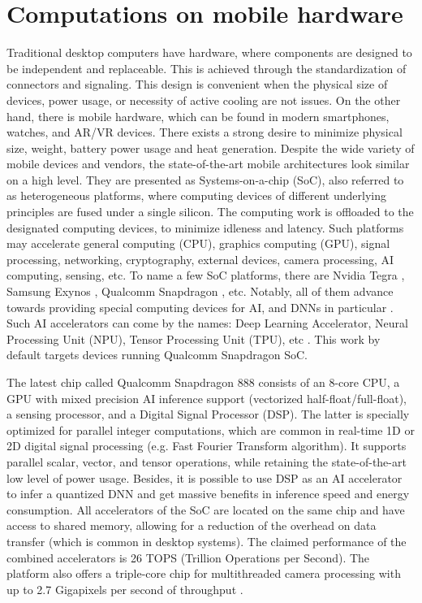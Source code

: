 %

\section{Computations on mobile hardware}
\label{lit:mobile}

Traditional desktop computers have hardware, where components are designed to be independent and replaceable. This is achieved through the standardization of connectors and signaling. This design is convenient when the physical size of devices, power usage, or necessity of active cooling are not issues. On the other hand, there is mobile hardware, which can be found in modern smartphones, watches, and AR/VR devices. There exists a strong desire to minimize physical size, weight, battery power usage and heat generation. Despite the wide variety of mobile devices and vendors, the state-of-the-art mobile architectures look similar on a high level. They are presented as Systems-on-a-chip (SoC), also referred to as heterogeneous platforms, where computing devices of different underlying principles are fused under a single silicon. The computing work is offloaded to the designated computing devices, to minimize idleness and latency. Such platforms may accelerate general computing (CPU), graphics computing (GPU), signal processing, networking, cryptography, external devices, camera processing, AI computing, sensing, etc. To name a few SoC platforms, there are Nvidia Tegra \cite{soc:nvidia-tegra}, Samsung Exynos \cite{soc:exynos}, Qualcomm Snapdragon \cite{soc:snapdragon}, etc. Notably, all of them advance towards providing special computing devices for AI, and DNNs in particular \cite{mobile:dl-review19}. Such AI accelerators can come by the names: Deep Learning Accelerator, Neural Processing Unit (NPU), Tensor Processing Unit (TPU), etc \cite{soc:tops}. This work by default targets devices running Qualcomm Snapdragon SoC.

The latest chip called Qualcomm Snapdragon 888 consists of an 8-core CPU, a GPU with mixed precision AI inference support (vectorized half-float/full-float), a sensing processor, and a Digital Signal Processor (DSP). The latter is specially optimized for parallel integer computations, which are common in real-time 1D or 2D digital signal processing (e.g. Fast Fourier Transform algorithm). It supports parallel scalar, vector, and tensor operations, while retaining the state-of-the-art low level of power usage. Besides, it is possible to use DSP as an AI accelerator to infer a quantized DNN and get massive benefits in inference speed and energy consumption. All accelerators of the SoC are located on the same chip and have access to shared memory, allowing for a reduction of the overhead on data transfer (which is common in desktop systems). The claimed performance of the combined accelerators is 26 TOPS (Trillion Operations per Second). The platform also offers a triple-core chip for multithreaded camera processing with up to 2.7 Gigapixels per second of throughput \cite{soc:snapdragon888}.

